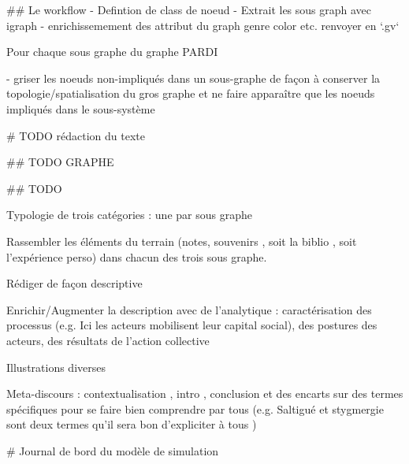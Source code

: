 ## Le workflow
- Defintion de class de noeud
- Extrait les sous graph avec igraph
- enrichissemement des attribut du graph genre color etc.
renvoyer en `.gv`

Pour chaque sous graphe du graphe PARDI 

-  griser les noeuds non-impliqués dans un sous-graphe de façon à conserver la topologie/spatialisation du gros graphe et ne faire apparaître que les noeuds impliqués dans le sous-système



# TODO rédaction du texte 

## TODO GRAPHE

## TODO 

Typologie de trois catégories : une par sous graphe 

Rassembler les éléments du terrain (notes, souvenirs , soit la biblio , soit l'expérience perso) dans chacun des trois sous graphe.

Rédiger de façon descriptive

Enrichir/Augmenter la description avec de l'analytique  : caractérisation des processus (e.g. Ici les acteurs mobilisent leur capital social), des postures des acteurs, des résultats de l'action collective 


Illustrations diverses

Meta-discours : contextualisation , intro , conclusion et des encarts sur des termes spécifiques pour se faire bien comprendre par tous (e.g. Saltigué et stygmergie sont deux termes qu'il sera bon d'expliciter à tous )






# Journal de bord du modèle de simulation



